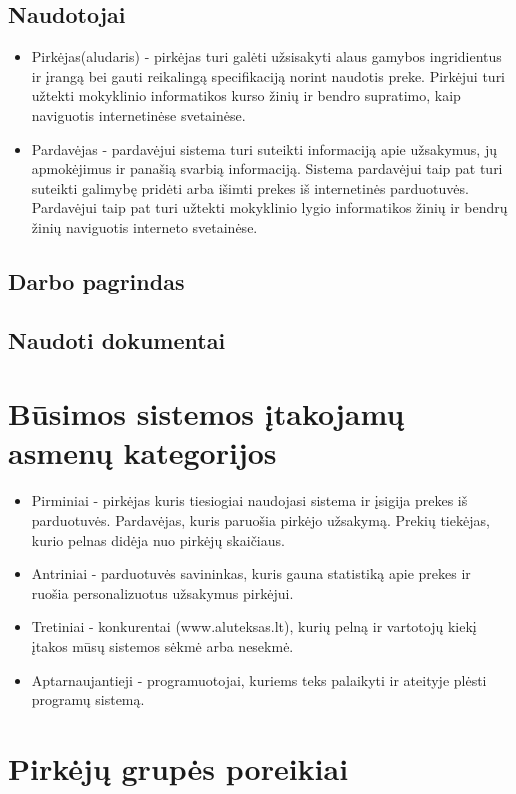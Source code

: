 \documentclass[oneside]{VUMIFPSkursinis}
\begin{document}
	\subsection{Naudotojai}
		\begin{itemize}
			\item{Pirkėjas(aludaris) - pirkėjas turi galėti užsisakyti alaus gamybos ingridientus ir įrangą bei gauti reikalingą specifikaciją norint naudotis preke.
				Pirkėjui turi užtekti mokyklinio informatikos kurso žinių ir bendro supratimo, kaip naviguotis internetinėse svetainėse.}
			\item{Pardavėjas - pardavėjui sistema turi suteikti informaciją apie užsakymus, jų apmokėjimus ir panašią svarbią informaciją.
				Sistema pardavėjui taip pat turi suteikti galimybę pridėti arba išimti prekes iš internetinės parduotuvės.
				Pardavėjui taip pat turi užtekti mokyklinio lygio informatikos žinių ir bendrų žinių naviguotis interneto svetainėse.}
		\end{itemize}
	\subsection{Darbo pagrindas}
	\subsection{Naudoti dokumentai}

\section{Būsimos sistemos įtakojamų asmenų kategorijos}
\begin{itemize}
			\item{Pirminiai - pirkėjas kuris tiesiogiai naudojasi sistema ir įsigija prekes iš parduotuvės. 
				Pardavėjas, kuris paruošia pirkėjo užsakymą. 
				Prekių tiekėjas, kurio pelnas didėja nuo pirkėjų skaičiaus.}
			\item{Antriniai - parduotuvės savininkas, kuris gauna statistiką apie prekes ir ruošia personalizuotus užsakymus pirkėjui.}
			\item{Tretiniai - konkurentai (www.aluteksas.lt), kurių pelną ir vartotojų kiekį įtakos mūsų sistemos sėkmė arba nesekmė. }
			\item{Aptarnaujantieji - programuotojai, kuriems teks palaikyti ir ateityje plėsti programų sistemą.}
		\end{itemize}

\section{Pirkėjų grupės poreikiai}
\end{document}
